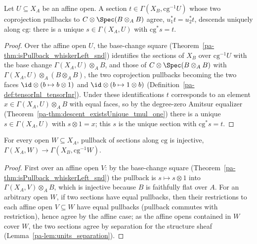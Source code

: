 \begin{theorem}
  \label{pa-thm:existsUnique_appLE_eq}
  \leanok

  Let \(U \subseteq X_A\) be an affine open. A section \(t \in \Gamma(X_B, \mathrm{cg}^{-1}U)\)
  whose two coprojection pullbacks to \(C \otimes \Spec(B \otimes_A B)\) agree,
  \(u_1^{*} t = u_2^{*} t\), descends uniquely along \(\mathrm{cg}\): there is a unique \(s \in
  \Gamma(X_A, U)\) with \(\mathrm{cg}^{*} s = t\).
\end{theorem}
\begin{proof}
  \leanok
  Over the affine open \(U\), the base-change square (Theorem~\ref{pa-thm:isPullback_whiskerLeft_snd})
  identifies the sections of \(X_B\) over \(\mathrm{cg}^{-1}U\) with the base change \(\Gamma(X_A,
  U) \otimes_A B\), and those of \(C \otimes \Spec(B \otimes_A B)\) with \(\Gamma(X_A, U)
  \otimes_A (B \otimes_A B)\), the two coprojection pullbacks becoming the two faces
  \(\id \otimes (b \mapsto b \otimes 1)\) and \(\id \otimes (b \mapsto 1 \otimes b)\)
  (Definition~\ref{pa-def:tensorInl_tensorInr}).  Under these identifications \(t\) corresponds to
  an element \(x \in \Gamma(X_A, U) \otimes_A B\) with equal faces, so by the degree-zero Amitsur
  equalizer (Theorem~\ref{pa-thm:descent_existsUnique_tmul_one}) there is a unique \(s \in \Gamma(X_A,
  U)\) with \(s \otimes 1 = x\); this \(s\) is the unique section with \(\mathrm{cg}^{*} s = t\).
\end{proof}

\begin{theorem}
  \label{pa-thm:appLE_whiskerLeft_injective}
  \leanok

  For every open \(W \subseteq X_A\), pullback of sections along \(\mathrm{cg}\) is injective,
  \(\Gamma(X_A, W) \to \Gamma(X_B, \mathrm{cg}^{-1}W)\).
\end{theorem}
\begin{proof}
  \leanok
  First over an affine open \(V\): by the base-change square
  (Theorem~\ref{pa-thm:isPullback_whiskerLeft_snd}) the pullback is \(s \mapsto s \otimes 1\) into
  \(\Gamma(X_A, V) \otimes_A B\), which is injective because \(B\) is faithfully flat over
  \(A\).  For an arbitrary open \(W\), if two sections have equal pullbacks, then their
  restrictions to each affine open \(V \subseteq W\) have equal pullbacks (pullback commutes
  with restriction), hence agree by the affine case; as the affine opens contained in \(W\)
  cover \(W\), the two sections agree by separation for the structure sheaf
  (Lemma~\ref{pa-lem:units_separation}).
\end{proof}

